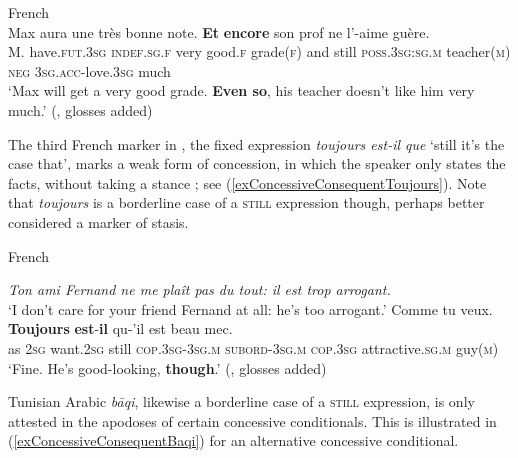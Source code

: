 \begin{exe}
	\ex French\label{exConcessiveConsequentEtEncore}\\
	\gll Max aura une très bonne note. \textbf{Et} \textbf{encore} son prof ne l'-aime guère.\\
	M. have.\textsc{fut}.3\textsc{sg} \textsc{indef}.\textsc{sg}.\textsc{f} very good.\textsc{f} grade(\textsc{f}) and still \textsc{poss}.3\textsc{sg}:\textsc{sg}.\textsc{m} teacher(\textsc{m}) \textsc{neg} 3\textsc{sg}.\textsc{acc}-love.3\textsc{sg} much\\
	\glt \lq Max will get a very good grade. \textbf{Even so}, his teacher doesn’t like him very much.' (\cite[195]{MosegaardHansen2008}, glosses added)
\end{exe}

The third French marker in , the fixed expression \textit{toujours est-il que} \lq still it's the case that\rq{}, marks a weak form of concession, in which the speaker only states the facts, without taking a stance \parencite[199–201]{MosegaardHansen2008}; see (\ref{exConcessiveConsequentToujours}). Note that \textit{toujours} is a borderline case of a \textsc{still} expression though, perhaps better considered a marker of stasis.\pagebreak

\begin{exe}
	\ex French\label{exConcessiveConsequentToujours}
	\begin{xlist}
		\textit{Ton ami Fernand ne me plaît pas du tout: il est trop arrogant.}\\
		\lq I don’t care for your friend Fernand at all: he’s too arrogant.\rq{}
		\gll  Comme tu veux. \textbf{Toujours} \textbf{est}-\textbf{il} qu-\rq{}il est beau mec.\\
		as 2\textsc{sg} want.2\textsc{sg} still \textsc{cop}.3\textsc{sg}-3\textsc{sg}.\textsc{m} \textsc{subord}-3\textsc{sg}.\textsc{m} \textsc{cop}.3\textsc{sg} attractive.\textsc{sg}.\textsc{m} guy(\textsc{m})\\
		\glt \lq Fine. He’s good-looking, \textbf{though}.\rq{ }(\cite[199]{MosegaardHansen2008}, glosses added)
	\end{xlist}
\end{exe}  

Tunisian Arabic \textit{bāqi}, likewise a borderline case of a \textsc{still} expression, is only attested in the apodoses of certain concessive conditionals. This is illustrated in (\ref{exConcessiveConsequentBaqi}) for an alternative concessive conditional.

